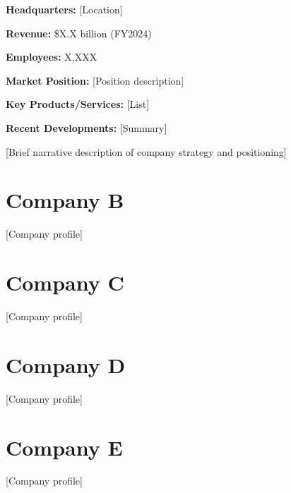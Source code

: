 \documentclass[11pt,letterpaper]{report}
\begin{document}
\begin{calloutbox}
\textbf{Headquarters:} [Location]

\textbf{Revenue:} \$X.X billion (FY2024)

\textbf{Employees:} X,XXX

\textbf{Market Position:} [Position description]

\textbf{Key Products/Services:} [List]

\textbf{Recent Developments:} [Summary]
\end{calloutbox}

[Brief narrative description of company strategy and positioning]

\section{Company B}
[Company profile]

\section{Company C}
[Company profile]

\section{Company D}
[Company profile]

\section{Company E}
[Company profile]

\newpage



% 
% 
%

\end{document}
